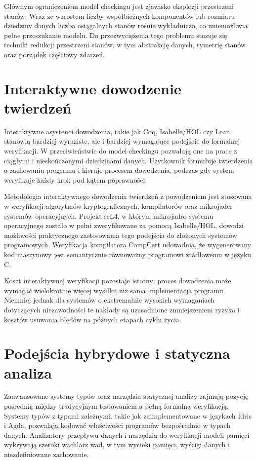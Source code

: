 \documentclass[
    language=polish,
    doctype=article,
]{../../omnilatex}
\begin{document}
Głównym ograniczeniem model checkingu jest zjawisko eksplozji przestrzeni stanów. Wraz ze wzrostem liczby współbieżnych komponentów lub rozmiaru dziedziny danych liczba osiągalnych stanów rośnie wykładniczo, co uniemożliwia pełne przeszukanie modelu. Do przezwyciężenia tego problemu stosuje się techniki redukcji przestrzeni stanów, w tym abstrakcję danych, symetrię stanów oraz porządek częściowy zdarzeń.

\section{Interaktywne dowodzenie twierdzeń}
Interaktywne asystenci dowodzenia, takie jak Coq, Isabelle/HOL czy Lean, stanowią bardziej wyraziste, ale i bardziej wymagające podejście do formalnej weryfikacji. W przeciwieństwie do model checkingu pozwalają one na pracę z ciągłymi i nieskończonymi dziedzinami danych. Użytkownik formułuje twierdzenia o zachowaniu programu i kieruje procesem dowodzenia, podczas gdy system weryfikuje każdy krok pod kątem poprawności.

Metodologia interaktywnego dowodzenia twierdzeń z powodzeniem jest stosowana w weryfikacji algorytmów kryptograficznych, kompilatorów oraz mikrojader systemów operacyjnych. Projekt seL4, w którym mikrojadro systemu operacyjnego zostało w pełni zweryfikowane za pomocą Isabelle/HOL, dowodzi możliwości praktycznego zastosowania tego podejścia do złożonych systemów programowych. Weryfikacja kompilatora CompCert udowadnia, że wygenerowany kod maszynowy jest semantycznie równoważny programowi źródłowemu w języku C.

Koszt interaktywnej weryfikacji pozostaje istotny: proces dowodzenia może wymagać wielokrotnie więcej wysiłku niż sama implementacja programu. Niemniej jednak dla systemów o ekstremalnie wysokich wymaganiach dotyczących niezawodności te nakłady są uzasadnione zmniejszeniem ryzyka i kosztów usuwania błędów na późnych etapach cyklu życia.

\section{Podejścia hybrydowe i statyczna analiza}
Zaawansowane systemy typów oraz narzędzia statycznej analizy zajmują pozycję pośrednią między tradycyjnym testowaniem a pełną formalną weryfikacją. Systemy typów z typami zależnymi, takie jak zaimplementowane w językach Idris i Agda, pozwalają kodować właściwości programów bezpośrednio w typach danych. Analizatory przepływu danych i narzędzia do weryfikacji modeli pamięci wykrywają szeroki wachlarz wad, w tym wycieki pamięci, wyścigi danych i niezdefiniowane zachowanie.
\end{document}

